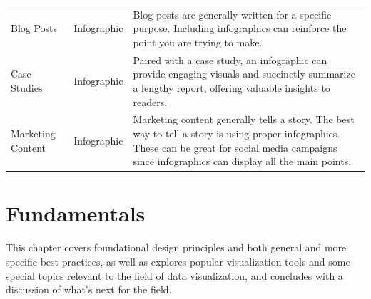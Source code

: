 \documentclass[]{book}
\begin{document}
\begin{longtable}[]{@{}lll@{}}
\begin{minipage}[t]{0.11\columnwidth}\raggedright\strut
Blog Posts\strut
\end{minipage} & \begin{minipage}[t]{0.15\columnwidth}\raggedright\strut
Infographic\strut
\end{minipage} & \begin{minipage}[t]{0.47\columnwidth}\raggedright\strut
Blog posts are generally written for a specific purpose. Including
infographics can reinforce the point you are trying to make.\strut
\end{minipage}\tabularnewline
\begin{minipage}[t]{0.11\columnwidth}\raggedright\strut
Case Studies\strut
\end{minipage} & \begin{minipage}[t]{0.15\columnwidth}\raggedright\strut
Infographic\strut
\end{minipage} & \begin{minipage}[t]{0.47\columnwidth}\raggedright\strut
Paired with a case study, an infographic can provide engaging visuals
and succinctly summarize a lengthy report, offering valuable insights to
readers.\strut
\end{minipage}\tabularnewline
\begin{minipage}[t]{0.11\columnwidth}\raggedright\strut
Marketing Content\strut
\end{minipage} & \begin{minipage}[t]{0.15\columnwidth}\raggedright\strut
Infographic\strut
\end{minipage} & \begin{minipage}[t]{0.47\columnwidth}\raggedright\strut
Marketing content generally tells a story. The best way to tell a story
is using proper infographics. These can be great for social media
campaigns since infographics can display all the main points.\strut
\end{minipage}\tabularnewline
\bottomrule
\end{longtable}

\chapter{Fundamentals}\label{fundamentals}

This chapter covers foundational design principles and both general and
more specific best practices, as well as explores popular visualization
tools and some special topics relevant to the field of data
visualization, and concludes with a discussion of what's next for the
field.
\end{document}
